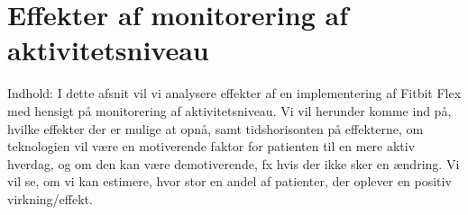 \section{Effekter af monitorering af aktivitetsniveau}
Indhold: I dette afsnit vil vi analysere effekter af en implementering af Fitbit Flex med hensigt på monitorering af aktivitetsniveau. Vi vil herunder komme ind på, hvilke effekter der er mulige at opnå, samt tidshorisonten på effekterne, om teknologien vil være en motiverende faktor for patienten til en mere aktiv hverdag, og om den kan være demotiverende, fx hvis der ikke sker en ændring. Vi vil se, om vi kan estimere, hvor stor en andel af patienter, der oplever en positiv virkning/effekt. 

